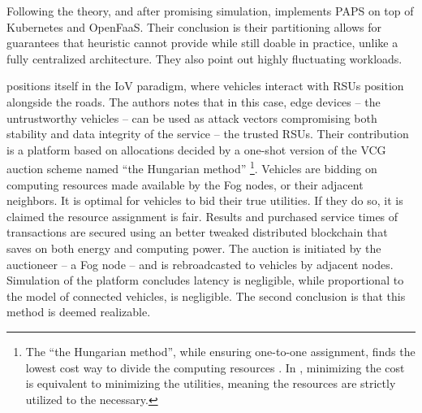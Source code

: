 \documentclass[11pt]{sdm}
\begin{document}
\begin{description}
	Following the theory, and after promising simulation, \citet{baresi_paps_2021} implements \gls{PAPS} on top of Kubernetes and OpenFaaS. Their conclusion is their partitioning allows for guarantees that heuristic cannot provide while still doable in practice, unlike a fully centralized architecture. They also point out highly fluctuating workloads.
	
	\item[\citet{lee_trustful_2020}] positions itself in the \gls{IoV} paradigm, where vehicles interact with \glspl{RSU} position alongside the roads. The authors notes that in this case, edge devices -- the untrustworthy vehicles -- can be used as attack vectors compromising both stability and data integrity of the service -- the trusted \glspl{RSU}. Their contribution is a platform based on allocations decided by a one-shot version of the \gls{VCG} auction scheme named ``the Hungarian method'' \footnote{The ``the Hungarian method'', while ensuring one-to-one assignment, finds the lowest cost way to divide the computing resources \cite{wikipedia_hungarian_2021}. In \cite{lee_trustful_2020}, minimizing the cost is equivalent to minimizing the utilities, meaning the resources are strictly utilized to the necessary.}. Vehicles are bidding on computing resources made available by the Fog nodes, or their adjacent neighbors. It is optimal for vehicles to bid their true utilities. If they do so, it is claimed the resource assignment is fair. Results and purchased service times of transactions are secured using an better tweaked distributed blockchain that saves on both energy and computing power. The auction is initiated by the auctioneer -- a Fog node -- and is rebroadcasted to vehicles by adjacent nodes. Simulation of the platform concludes latency is negligible, while proportional to the model of connected vehicles, is negligible. The second conclusion is that this method is deemed realizable.
	

\end{description}
\end{document}
